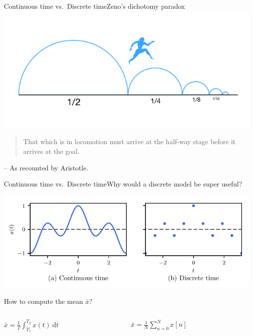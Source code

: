 \documentclass[usenames,dvipsnames,svgnames,10pt,aspectratio=169]{beamer}
\begin{document}
\begin{frame}[t, c]{Continuous time vs.\ Discrete time}{Zeno's dichotomy paradox}
	\centering
	\includegraphics[width=.66\textwidth]{Zeno_Dichotomy_Paradox}

	\begin{quote}
		That which is in locomotion must arrive at the half-way stage before it arrives at the goal.
	\end{quote}
	\begin{flushright}
		-- As recounted by Aristotle.
	\end{flushright}

	\vspace{1cm}
\end{frame}

\begin{frame}[t, c]{Continuous time vs.\ Discrete time}{Why would a discrete model be super useful?}
	\centering

	\includegraphics[width=.75\textwidth]{Continuous_vs_Discrete_bis}

	How to compute the mean $\bar{x}$?

	\begin{columns}
		\begin{column}{.4\textwidth}
			\centering
			$\bar{x} = \displaystyle \frac{1}{T} \int_{T_1}^{T_2} x(t)\ \mathrm{d}t$
		\end{column}
		\begin{column}{.4\textwidth}
			\centering
			$\bar{x} = \displaystyle \frac{1}{N} \sum_{n=0}^N x [n]$
		\end{column}
	\end{columns}
	\vspace{0.5cm}
\end{frame}
\end{document}
